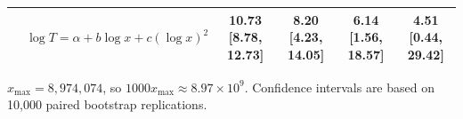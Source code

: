 \documentclass[ijoc,blindrev]{informs3} %
\begin{document}
\begin{APPENDICES}
{\begin{table}[!ht]
{\begin{tabular}{llcccc}
& \(\log T=\alpha+b\log x+c(\log x)^2\)
& 10.73 [8.78, 12.73]
& 8.20 [4.23, 14.05]
& 6.14 [1.56, 18.57]
& 4.51 [0.44, 29.42] \\

\bottomrule
\end{tabular}
}
\begin{flushleft}
\footnotesize
\(x_{\max}=8{,}974{,}074\), so \(1000x_{\max}\approx8.97\times10^9\).
Confidence intervals are based on 10,000 paired bootstrap replications.
\end{flushleft}
\end{table}
}



\end{APPENDICES}
\end{document}
